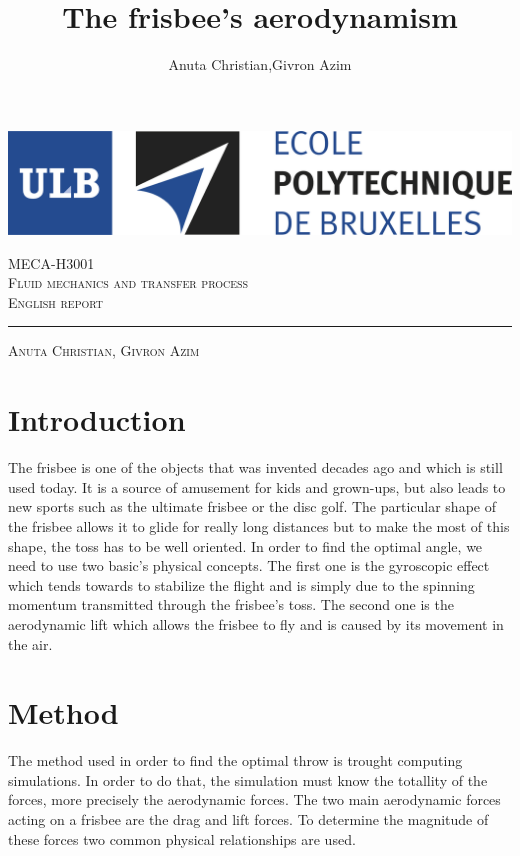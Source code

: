 \documentclass[10pt,a4paper]{report}
\author{Anuta Christian,Givron Azim}
\title{The frisbee's aerodynamism}
\begin{document}
\begin{titlepage}

\includegraphics[scale=0.5]{logo-polytech-ULB-FR.jpg}

\center 
\vspace{5cm}
\textsc{\large MECA-H3001} \\[0.5cm]
\textsc{\LARGE Fluid mechanics and transfer process} \\[1.5cm]
\textsc{\Large English report} %

\rule{\textwidth}{1pt}

\vspace{2cm}

\textsc{\large Anuta Christian, Givron Azim}

\end{titlepage}



\tableofcontents
\newpage 
\section{Introduction}
The frisbee is one of the objects that was invented decades ago and which is still used today. It is a source of amusement for kids and grown-ups, but also leads to new sports such as the ultimate frisbee or the disc golf. The particular shape of the frisbee allows it to glide for really long distances but to make the most of this shape, the toss has to be well oriented. In order to find the optimal angle, we need to use two basic’s physical concepts. The first one is the gyroscopic effect which tends towards to stabilize the flight and is simply due to the spinning momentum transmitted through the frisbee’s toss. The second one is the aerodynamic lift which allows the frisbee to fly and is caused by its movement in the air.
\section{Method}
The method used in order to find the optimal throw is trought computing simulations. In order to do that, the simulation must know the totallity of the forces, more precisely the aerodynamic forces. The two main aerodynamic forces acting on a frisbee are the drag and lift forces. To determine the magnitude of these forces two common physical relationships are used.
\end{document}
